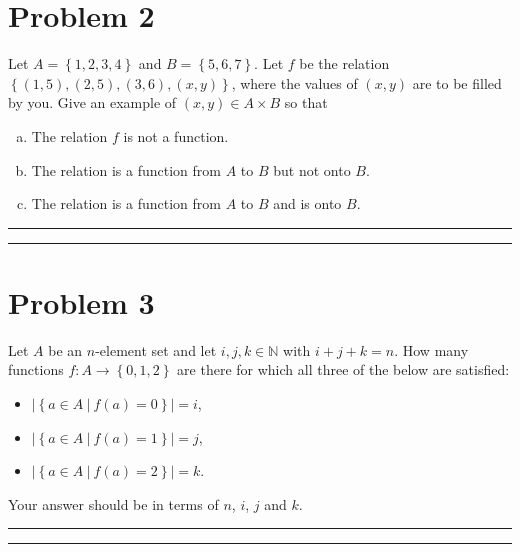 \documentclass{article}
\theoremstyle{definition}
\newenvironment{solution}{\bigskip\hrule{\hfill}}{\bigskip\hrule{\hfill}} %
\begin{document}
\newpage


\section*{Problem 2}
Let $A=\left\{1,2,3,4\right\}$ and $B=\left\{5,6,7\right\}$. Let $f$ be the relation $\left\{\left(1,5\right),\left(2,5\right),\left(3,6\right),\left(x,y\right)\right\}$, where the values of $\left(x,y\right)$ are to be filled by you. Give an example of $\left(x,y\right)\in A\times B$ so that
\begin{enumerate}[a)] %
    \item The relation $f$ is not a function.
    \item The relation is a function from $A$ to $B$ but not onto $B$.
    \item The relation is a function from $A$ to $B$ and is onto $B$.
\end{enumerate}
\begin{solution}


\end{solution}


\newpage


\section*{Problem 3}
Let $A$ be an $n$-element set and let $i,j,k\in\mathbb{N}$ with $i+j+k=n$. How many functions $f:A\longrightarrow\left\{0,1,2\right\}$ are there for which all three of the below are satisfied:
\begin{itemize}
    \item $\left|\left\{a\in A~\big\vert~f\left(a\right)=0\right\}\right|=i$,
    \item $\left|\left\{a\in A~\big\vert~f\left(a\right)=1\right\}\right|=j$,
    \item $\left|\left\{a\in A~\big\vert~f\left(a\right)=2\right\}\right|=k$.
\end{itemize}
Your answer should be in terms of $n$, $i$, $j$ and $k$.
\begin{solution}


\end{solution}
\end{document}
